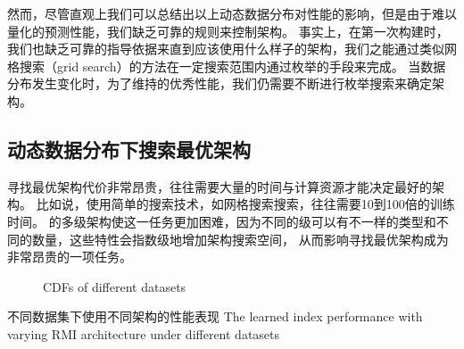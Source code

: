 然而，尽管直观上我们可以总结出以上动态数据分布对{\li}性能的影响，但是由于{\model}难以量化的预测性能，我们缺乏可靠的规则来控制{\rmi}架构。
事实上，在第一次构建{\li}时，我们也缺乏可靠的指导依据来直到应该使用什么样子的{\rmi}架构，我们之能通过类似网格搜索\cite{lavalle2004relationship, lerman1980fitting}（grid search）的方法在一定搜索范围内通过枚举的手段来完成。
当数据分布发生变化时，为了维持{\li}的优秀性能，我们仍需要不断进行枚举搜索来确定{\rmi}架构。

\subsection{动态数据分布下搜索最优{\li}架构}
\label{sec:search-best}

寻找最优{\li}架构代价非常昂贵，往往需要大量的时间与计算资源才能决定最好的{\li}架构。
比如说，使用简单的搜索技术，如网格搜索搜索，往往需要10到100倍的训练时间。
{\li}的多级架构使这一任务更加困难，因为不同的级可以有不一样的{\model}类型和不同的{\model}数量，这些特性会指数级地增加架构搜索空间，
从而影响寻找最优{\li}架构成为非常昂贵的一项任务。

% 

\begin{figure}[!htp]
  \centering
    {CDFs of different datasets}
  \label{fig:dist}
\end{figure}

\begin{table}[!hpb]
  \centering
    {不同数据集下使用不同{\rmi}架构的{\li}性能表现}
    {The learned index performance with varying RMI architecture under different datasets}
  \label{tab:dist}
  \begin{tabular}{@{}llr@{}} \toprule
  \end{tabular}
\end{table}

